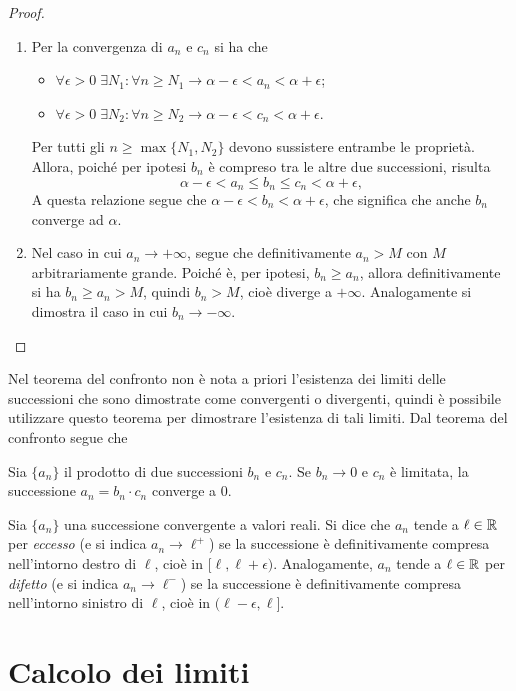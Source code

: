 \begin{proof}
\begin{enumerate}
\item Per la convergenza di $a_n$ e $c_n$ si ha che
	\begin{itemize}
		\item $\forall\epsilon>0\;\exists N_1\colon\forall n\geq N_1\to\alpha-\epsilon<a_n<\alpha+\epsilon$;
		\item $\forall\epsilon>0\;\exists N_2\colon\forall n\geq N_2\to\alpha-\epsilon<c_n<\alpha+\epsilon$.
	\end{itemize}
Per tutti gli $n\geq\max\{N_1,N_2\}$ devono sussistere entrambe le proprietà. Allora, poiché per ipotesi $b_n$ è compreso tra le altre due successioni, risulta
\[
\alpha-\epsilon<a_n\leq b_n\leq c_n<\alpha+\epsilon,
\]
A questa relazione segue che $\alpha-\epsilon<b_n<\alpha+\epsilon$, che significa che anche $b_n$ converge ad $\alpha$.
\item Nel caso in cui $a_n\to +\infty$, segue che definitivamente $a_n>M$ con $M$ arbitrariamente grande. Poiché è, per ipotesi, $b_n\geq a_n$, allora definitivamente si ha $b_n\geq a_n>M$, quindi $b_n>M$, cioè diverge a $+\infty$.
Analogamente si dimostra il caso in cui $b_n\to -\infty$.\qedhere
\end{enumerate}
\end{proof}
Nel teorema del confronto non è nota a priori l'esistenza dei limiti delle successioni che sono dimostrate come convergenti o divergenti, quindi è possibile utilizzare questo teorema per dimostrare l'esistenza di tali limiti.
Dal teorema del confronto segue che
\begin{osservazione}
Sia $\{a_n\}$ il prodotto di due successioni $b_n$ e $c_n$. Se $b_n\to 0$ e $c_n$ è limitata, la successione $a_n=b_n\cdot c_n$ converge a 0.
\end{osservazione}

\begin{definizione}
Sia $\{a_n\}$ una successione convergente a valori reali. Si dice che $a_n$ tende a $\ell\in\mathbb{R}$ per \emph{eccesso} (e si indica $a_n\to\ell^+$) se la successione è definitivamente compresa nell'intorno destro di $\ell$, cioè in $[\ell,\ell+\epsilon)$.
Analogamente, $a_n$ tende a $\ell\in\mathbb{R}$ per \emph{difetto} (e si indica $a_n\to\ell^-$) se la successione è definitivamente compresa nell'intorno sinistro di $\ell$, cioè in $(\ell-\epsilon,\ell]$.
\end{definizione}

\section{Calcolo dei limiti}
